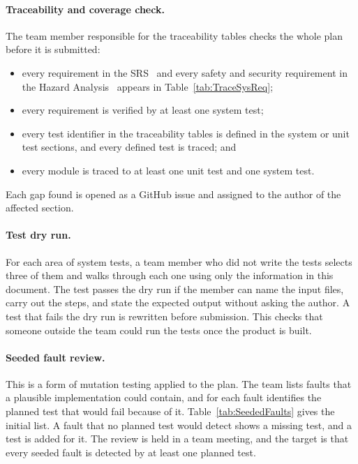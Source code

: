 \documentclass[12pt, titlepage]{article}
\begin{document}
\paragraph{Traceability and coverage check.}
The team member responsible for the traceability tables checks the whole plan
before it is submitted:
\begin{itemize}
  \item every requirement in the SRS~\citep{TeamBVSH2026SRS} and every safety
  and security requirement in the Hazard Analysis~\citep{TeamBVSH2026HA}
  appears in Table~\ref{tab:TraceSysReq};
  \item every requirement is verified by at least one system test;
  \item every test identifier in the traceability tables is defined in the
  system or unit test sections, and every defined test is traced; and
  \item every module is traced to at least one unit test and one system test.
\end{itemize}
Each gap found is opened as a GitHub issue and assigned to the author of the
affected section.

\paragraph{Test dry run.}
For each area of system tests, a team member who did not write the tests
selects three of them and walks through each one using only the information in
this document. The test passes the dry run if the member can name the input
files, carry out the steps, and state the expected output without asking the
author. A test that fails the dry run is rewritten before submission. This
checks that someone outside the team could run the tests once the product is
built.

\paragraph{Seeded fault review.}
This is a form of mutation testing applied to the plan. The team lists faults
that a plausible implementation could contain, and for each fault identifies
the planned test that would fail because of it. Table~\ref{tab:SeededFaults}
gives the initial list. A fault that no planned test would detect shows a
missing test, and a test is added for it. The review is held in a team meeting,
and the target is that every seeded fault is detected by at least one planned
test.
\end{document}
